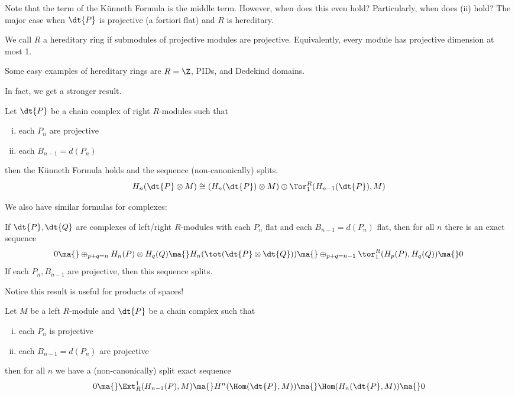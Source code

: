 Note that the term of the K\"unneth Formula is the middle term. However, when does this even hold? Particularly, when does (ii) hold? The major case when $\dt{P}$ is projective (a fortiori flat) and $R$ is hereditary. 

\begin{dfn}
We call $R$ a hereditary ring if submodules of projective modules are projective. Equivalently, every module has projective dimension at most 1.
\end{dfn}

\begin{ex}
Some easy examples of hereditary rings are $R=\Z$, PIDs, and Dedekind domains.
\end{ex}

In fact, we get a stronger result.
\begin{thm}
Let $\dt{P}$ be a chain complex of right $R$-modules such that
\begin{enumerate}[(i)]
\item each $P_n$ are projective
\item each $B_{n-1}=d(P_n)$
\end{enumerate}
then the K\"unneth Formula holds and the sequence (non-canonically) splits. 
\[
H_n(\dt{P} \otimes M) \cong (H_n(\dt{P}) \otimes M) \oplus \Tor_1^R(H_{n-1}(\dt{P}),M)
\]
\end{thm}

We also have similar formulas for complexes:

\begin{thm}
If $\dt{P},\dt{Q}$ are complexes of left/right $R$-modules with each $P_n$ flat and each $B_{n-1}=d(P_n)$ flat, then for all $n$ there is an exact sequence
\[
0 \ma{} \oplus_{p+q=n} H_n(P) \otimes H_q(Q) \ma{} H_n(\tot(\dt{P} \otimes \dt{Q})) \ma{} \oplus_{p+q=n-1} \tor_1^R(H_p(P), H_q(Q)) \ma{} 0
\]
If each $P_n,B_{n-1}$ are projective, then this sequence splits.
\end{thm}

Notice this result is useful for products of spaces!

\begin{thm}
Let $M$ be a left $R$-module and $\dt{P}$ be a chain complex such that 
\begin{enumerate}[(i)]
\item each $P_n$ is projective
\item each $B_{n-1}=d(P_n)$ are projective
\end{enumerate}
then for all $n$ we have a (non-canonically) split exact sequence
\[
0 \ma{} \Ext_R^1(H_{n-1}(P),M) \ma{} H^n(\Hom(\dt{P},M)) \ma{} \Hom(H_n(\dt{P},M)) \ma{} 0
\]
\end{thm}


